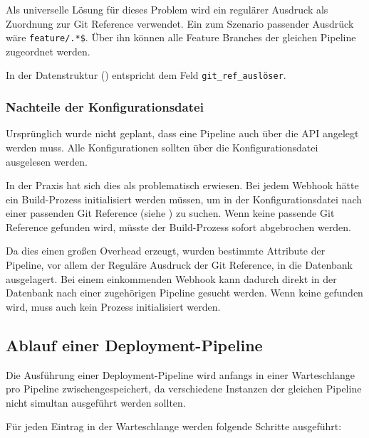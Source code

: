 Als universelle Lösung für dieses Problem wird ein regulärer Ausdruck als Zuordnung zur Git Reference verwendet. Ein zum Szenario passender Ausdrück wäre \texttt{feature/.*\$}. Über ihn können alle Feature Branches der gleichen Pipeline zugeordnet werden.

In der Datenstruktur () entspricht dem Feld \texttt{git\_ref\_auslöser}.

\subsubsection{Nachteile der Konfigurationsdatei}

Ursprünglich wurde nicht geplant, dass eine Pipeline auch über die API angelegt werden muss. Alle Konfigurationen sollten über die Konfigurationsdatei ausgelesen werden.

In der Praxis hat sich dies als problematisch erwiesen. Bei jedem Webhook hätte ein Build-Prozess initialisiert werden müssen, um in der Konfigurationsdatei nach einer passenden Git Reference (siehe ) zu suchen. Wenn keine passende Git Reference gefunden wird, müsste der Build-Prozess sofort abgebrochen werden.

Da dies einen großen Overhead erzeugt, wurden bestimmte Attribute der Pipeline, vor allem der Reguläre Ausdruck der Git Reference, in die Datenbank ausgelagert. Bei einem einkommenden Webhook kann dadurch direkt in der Datenbank nach einer zugehörigen Pipeline gesucht werden. Wenn keine gefunden wird, muss auch kein Prozess initialisiert werden.

\subsection{Ablauf einer Deployment-Pipeline}
\label{subsec:ablauf-build}

Die Ausführung einer Deployment-Pipeline wird anfangs in einer Warteschlange pro Pipeline zwischengespeichert, da verschiedene Instanzen der gleichen Pipeline nicht simultan ausgeführt werden sollten.

Für jeden Eintrag in der Warteschlange werden folgende Schritte ausgeführt:

